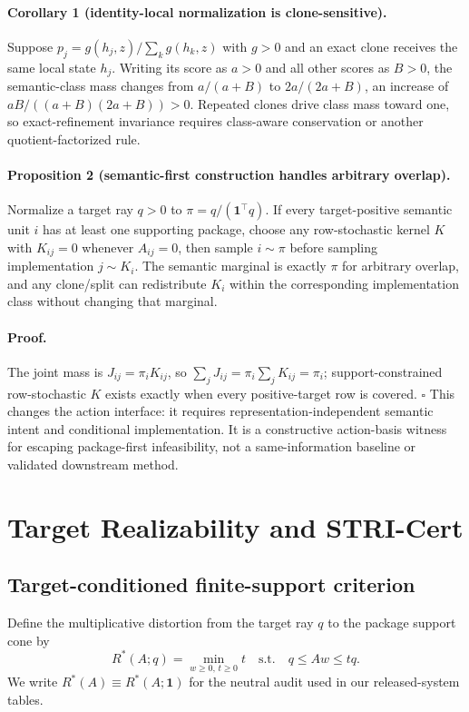 \paragraph{Corollary 1 (identity-local normalization is clone-sensitive).}
Suppose $p_j=g(h_j,z)/\sum_k g(h_k,z)$ with $g>0$ and an exact clone receives the same local state $h_j$. Writing its score as $a>0$ and all other scores as $B>0$, the semantic-class mass changes from $a/(a+B)$ to $2a/(2a+B)$, an increase of $aB/((a+B)(2a+B))>0$. Repeated clones drive class mass toward one, so exact-refinement invariance requires class-aware conservation or another quotient-factorized rule.

\paragraph{Proposition 2 (semantic-first construction handles arbitrary overlap).}
Normalize a target ray $q>0$ to $\pi=q/(\mathbf1^\top q)$. If every target-positive semantic unit $i$ has at least one supporting package, choose any row-stochastic kernel $K$ with $K_{ij}=0$ whenever $A_{ij}=0$, then sample $i\sim\pi$ before sampling implementation $j\sim K_i$. The semantic marginal is exactly $\pi$ for arbitrary overlap, and any clone/split can redistribute $K_i$ within the corresponding implementation class without changing that marginal.
\paragraph{Proof.}
The joint mass is $J_{ij}=\pi_iK_{ij}$, so $\sum_jJ_{ij}=\pi_i\sum_jK_{ij}=\pi_i$; support-constrained row-stochastic $K$ exists exactly when every positive-target row is covered. \hfill$\square$ This changes the action interface: it requires representation-independent semantic intent and conditional implementation. It is a constructive action-basis witness for escaping package-first infeasibility, not a same-information baseline or validated downstream method.

\section{Target Realizability and STRI-Cert}
\label{sec:certificate}

\subsection{Target-conditioned finite-support criterion}
Define the multiplicative distortion from the target ray $q$ to the package support cone by
\begin{equation}
\label{eq:rstar}
R^*(A;q)=\min_{w\ge0,\,t\ge0}t
\quad\text{s.t.}\quad
q\le Aw\le tq.
\end{equation}
We write $R^*(A)\equiv R^*(A;\mathbf1)$ for the neutral audit used in our released-system tables.

